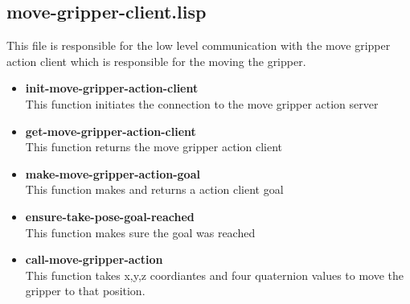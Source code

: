 \documentclass[main.tex]{subfiles}
\begin{document}
		\subsection{move-gripper-client.lisp}
		This file is responsible for the low level communication with the
		move gripper action client which is responsible for the moving the gripper.
		\begin{itemize}
			\item \textbf{init-move-gripper-action-client} \\
			This function initiates the connection to the move gripper action server
			\item \textbf{get-move-gripper-action-client} \\
			This function returns the move gripper action client
			\item \textbf{make-move-gripper-action-goal} \\
			This function makes and returns a action client goal
			\item \textbf{ensure-take-pose-goal-reached} \\
            This function makes sure the goal was reached
			\item \textbf{call-move-gripper-action} \\
			This function takes x,y,z coordiantes and four quaternion values to move the gripper to that position. 
		\end{itemize}
\end{document}
